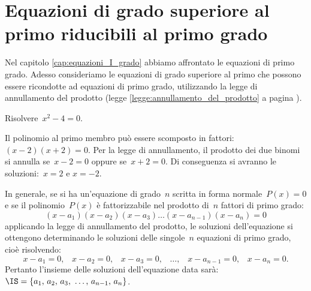 
\chapter{Equazioni di grado superiore al primo riducibili al primo grado}

Nel capitolo \ref{cap:equazioni_I_grado} abbiamo affrontato le equazioni di primo grado. Adesso consideriamo le equazioni di grado superiore al primo che possono essere ricondotte ad equazioni di primo grado,
utilizzando la legge di annullamento del prodotto (legge \ref{legge:annullamento_del_prodotto} a pagina \pageref{legge:annullamento_del_prodotto}).

\begin{exrig}
 \begin{esempio}
Risolvere~$x^{2}-4=0$.

Il polinomio al primo membro può essere scomposto in fattori:~$(x-2)(x+2)=0$.
Per la legge di annullamento, il prodotto dei due binomi si annulla se~$x-2=0$ oppure se~$x+2=0$.
Di conseguenza si avranno le soluzioni:~$x=2$ e $x=-2$.
 \end{esempio}
\end{exrig}

In generale, se si ha un'equazione di grado~$n$ scritta in forma normale~$P(x)=0$ e se il polinomio~$P(x)$ è
fattorizzabile nel prodotto di~$n$ fattori di primo grado:
\begin{equation*}
(x-a_{1})(x-a_{2})(x-a_{3})\ldots (x-a_{n-1})(x-a_{n})=0
\end{equation*}
applicando la legge di annullamento del prodotto, le soluzioni dell'equazione si ottengono determinando le soluzioni delle singole~$n$
equazioni di primo grado, cioè risolvendo:
\begin{equation*}
x-a_{1}=0\text{,~~~}x-a_{2}=0\text{,~~~}x-a_{3}=0\text{,~~~}\ldots\text{,~~~}x-a_{n-1}=0\text{,~~~}x-a_{n}=0.
\end{equation*}
Pertanto l'insieme delle soluzioni dell'equazione data sarà:~$\IS=\{a_{1}\text{,~}a_{2}\text{,~}a_{3}\text{,~}\ldots\text{,~}a_{n-1}\text{,~}a_{n}\}$.

